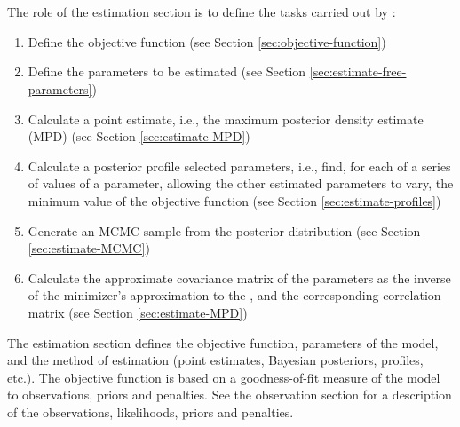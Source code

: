 \section{\label{sec:estimation-section}}

\subsection{\label{sec:role-of-the-estimation-section}}
The role of the estimation section is to define the tasks carried out by \CNAME:

\begin{enumerate}
  \item Define the objective function (see Section \ref{sec:objective-function})
  \item Define the parameters to be estimated (see Section \ref{sec:estimate-free-parameters})
  \item Calculate a point estimate, i.e., the maximum posterior density estimate (MPD) (see Section \ref{sec:estimate-MPD})
  \item Calculate a posterior profile selected parameters, i.e., find, for each of a series of values of a parameter, allowing the other estimated parameters to vary, the minimum value of the objective function (see Section \ref{sec:estimate-profiles})
  \item Generate an MCMC sample from the posterior distribution (see Section \ref{sec:estimate-MCMC})
  \item Calculate the approximate covariance matrix of the parameters as the inverse of the minimizer\textquoteright{}s approximation to the , and the corresponding correlation matrix (see Section \ref{sec:estimate-MPD})
\end{enumerate}

The estimation section defines the objective function, parameters of the model, and the method of estimation (point estimates, Bayesian posteriors, profiles, etc.). The objective function is based on a goodness-of-fit measure of the model to observations, priors and penalties. See the observation section for a description of the observations, likelihoods, priors and penalties.

\subsection{\label{sec:objective-function}}

